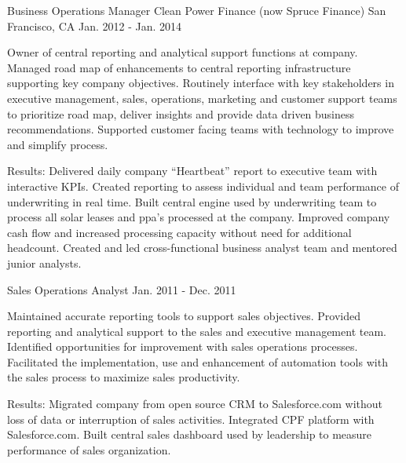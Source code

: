 \begin{cventries}

\cventry
{Business Operations Manager} %
{Clean Power Finance (now Spruce Finance)} %
{San Francisco, CA} %
{Jan. 2012 - Jan. 2014} %
{ %
\begin{cvitems}
\item {Owner of central reporting and analytical support functions at company. Managed road map of enhancements to central reporting infrastructure supporting key company objectives. Routinely interface with key stakeholders in executive management, sales, operations, marketing and customer support teams to prioritize road map, deliver insights and provide data driven business recommendations. Supported customer facing teams with technology to improve and simplify process.}
\end{cvitems}
}
\begin{cvitemsnb}
\item {Results: Delivered daily company ``Heartbeat'' report to executive team with interactive KPIs. Created reporting to assess individual and team performance of underwriting in real time. Built central engine used by underwriting team to process all solar leases and ppa's processed at the company. Improved company cash flow and increased processing capacity without need for additional headcount. Created and led cross-functional business analyst team and mentored junior analysts.}
\end{cvitemsnb}


\cventry
{Sales Operations Analyst} %
{} %
{} %
{Jan. 2011 - Dec. 2011} %
{ %
\begin{cvitems}
\item {Maintained accurate reporting tools to support sales objectives. Provided reporting and analytical support to the sales and executive management team. Identified opportunities for improvement with sales operations processes. Facilitated the implementation, use and enhancement of automation tools with the sales process to maximize sales productivity.}
\end{cvitems}
}
\begin{cvitemsnb}
\item {Results: Migrated company from open source CRM to Salesforce.com without loss of data or interruption of sales activities. Integrated CPF platform with Salesforce.com. Built central sales dashboard used by leadership to measure performance of sales organization.}
\end{cvitemsnb}


\end{cventries}
